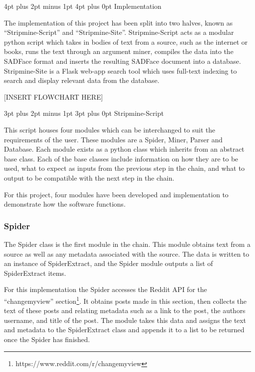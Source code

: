 \documentclass[12pt,a4paper]{article}
\makeatletter
\renewcommand\subsection{\@startsection {subsection}{1}{2mm} %
                               {3pt plus 2pt minus 1pt} %
                               {3pt plus 0pt} %
                               {\normalfont\bfseries}}
\renewcommand\section{\@startsection {section}{1}{0mm} %
                               {4pt plus 2pt minus 1pt} %
                               {4pt plus 0pt} %
                               {\bfseries}}
\makeatother
\begin{document}
\newpage
\section{Implementation}

The implementation of this project has been split into two halves, known as ``Stripmine-Script'' and ``Stripmine-Site''. Stripmine-Script acts as a modular python script which takes in bodies of text from a source, such as the internet or books, runs the text through an argument miner, compiles the data into the SADFace format and inserts the resulting SADFace document into a database. Stripmine-Site is a Flask web-app search tool which uses full-text indexing to search and display relevant data from the database.\newline

[INSERT FLOWCHART HERE]\newline

\subsection{Stripmine-Script}

This script houses four modules which can be interchanged to suit the requirements of the user. These modules are a Spider, Miner, Parser and Database. Each module exists as a python class which inherits from an abstract base class. Each of the base classes include information on how they are to be used, what to expect as inputs from the previous step in the chain, and what to output to be compatible with the next step in the chain. 

For this project, four modules have been developed and implementation to demonstrate how the software functions.

\subsubsection{Spider}

The Spider class is the first module in the chain. This module obtains text from a source as well as any metadata associated with the source. The data is written to an instance of SpiderExtract, and the Spider module outputs a list of SpiderExtract items.

For this implementation the Spider accesses the Reddit API for the ``changemyview'' section\footnote{https://www.reddit.com/r/changemyview}. It obtains posts made in this section, then collects the text of these posts and relating metadata such as a link to the post, the authors username, and title of the post. The module takes this data and assigns the text and metadata to the SpiderExtract class and appends it to a list to be returned once the Spider has finished. 
\end{document}
